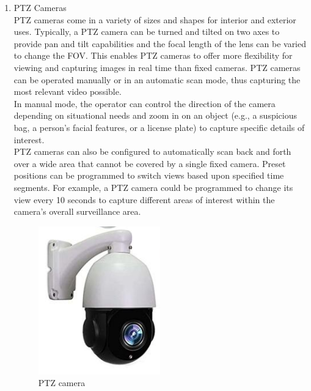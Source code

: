 \documentclass[12pt,fleqn]{book} %
\begin{document}
\begin{enumerate}
    \item PTZ Cameras 
    \\PTZ cameras come in a variety of sizes and shapes for interior and exterior uses. Typically, a PTZ camera can be turned and tilted on two axes to provide pan and tilt capabilities and the focal length of the lens can be varied to change the FOV. This enables PTZ cameras to offer more flexibility for viewing and capturing images in real time than fixed cameras. PTZ cameras can be operated manually or in an automatic scan mode, thus capturing the most relevant video possible.
    \\In manual mode, the operator can control the direction of the camera depending on situational needs and zoom in on an object (e.g., a suspicious bag, a person’s facial features, or a license plate) to capture specific details of interest.
    \\PTZ cameras can also be configured to automatically scan back and forth over a wide area that cannot be covered by a single fixed camera. Preset positions can be programmed to switch views based upon specified time segments. For example, a PTZ camera could be programmed to change its view every 10 seconds to capture different areas of interest within the camera’s overall surveillance area.
      \begin{figure}[!h]
    \centering
    \includegraphics[width=0.5\linewidth]{c 3.png}
    \caption{PTZ camera}
    \label{fig:c 3}
    \end{figure}
    

\end{enumerate}
\end{document}
